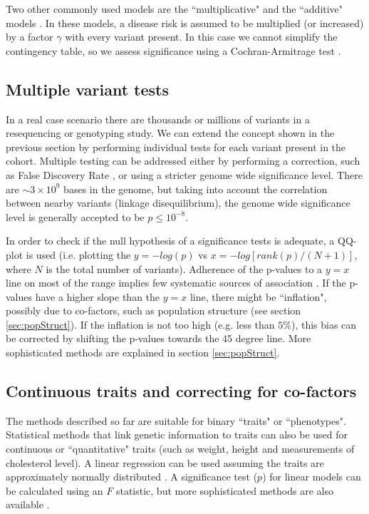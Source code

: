 Two other commonly used models are the ``multiplicative" and the ``additive" models \cite{balding2006tutorial,clarke2011basic}. 
In these models, a disease risk is assumed to be multiplied (or increased) by a factor $\gamma$ with every variant present. 
In this case we cannot simplify the contingency table, so we assess significance using a Cochran-Armitrage test \cite{clarke2011basic}.

\subsection{Multiple variant tests}

In a real case scenario there are thousands or millions of variants in a resequencing or genotyping study. 
We can extend the concept shown in the previous section by performing individual tests for each variant present in the cohort. 
Multiple testing can be addressed either by performing a correction, such as False Discovery Rate \cite{balding2006tutorial, clarke2011basic}, or using a stricter genome wide significance level. 
There are $\sim 3 \times 10^9$ bases in the genome, but taking into account the correlation between nearby variants (linkage disequilibrium), the genome wide significance level is generally accepted to be $p \leq 10^{-8}$.

In order to check if the null hypothesis of a significance tests is adequate, a QQ-plot is used \cite{clarke2011basic} (i.e. plotting the $y = -log(p)$ vs $x = -log[ rank(p) / (N+1) ]$, where $N$ is the total number of variants). 
Adherence of the p-values to a $y=x$ line on most of the range implies few systematic sources of association \cite{balding2006tutorial, clarke2011basic}. 
If the p-values have a higher slope than the $y=x$ line, there might be ``inflation", possibly due to co-factors, such as population structure (see section \ref{sec:popStruct}). 
If the inflation is not too high (e.g. less than $5\%$), this bias can be corrected by shifting the p-values towards the 45 degree line. 
More sophisticated methods are explained in section \ref{sec:popStruct}.

\subsection{Continuous traits and correcting for co-factors \label{sec:cofactors}}

The methods described so far are suitable for binary ``traits" or ``phenotypes". 
Statistical methods that link genetic information to traits can also be used for continuous or ``quantitative" traits (such as weight, height and measurements of cholesterol level). 
A linear regression can be used assuming the traits are approximately normally distributed \cite{balding2006tutorial, clarke2011basic}. 
A significance test ($p$) for linear models can be calculated using an $F$ statistic, but more sophisticated methods are also available \cite{balding2006tutorial, clarke2011basic}.

